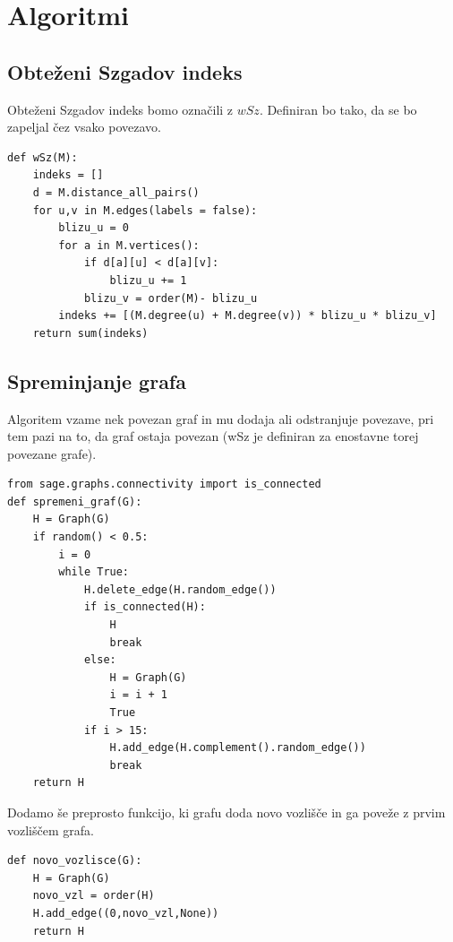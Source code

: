 \documentclass[12pt, a4paper]{article}
\begin{document}
\medskip


\newpage
\section[Algoritmi]{Algoritmi}

\subsection[Obteženi Szgadov indeks]{Obteženi Szgadov indeks}

Obteženi Szgadov indeks bomo označili z $wSz$. Definiran bo tako, da se bo zapeljal čez vsako povezavo.
 
\begin{verbatim}
def wSz(M):
    indeks = []
    d = M.distance_all_pairs()
    for u,v in M.edges(labels = false):
        blizu_u = 0
        for a in M.vertices():
            if d[a][u] < d[a][v]:
                blizu_u += 1
            blizu_v = order(M)- blizu_u
        indeks += [(M.degree(u) + M.degree(v)) * blizu_u * blizu_v]
    return sum(indeks)
\end{verbatim}

\subsection[Spreminjanje grafa]{Spreminjanje grafa}

Algoritem vzame nek povezan graf in mu dodaja ali odstranjuje povezave, pri tem pazi na to, da graf ostaja povezan (wSz je definiran za enostavne torej povezane grafe). 

\begin{verbatim}
from sage.graphs.connectivity import is_connected
def spremeni_graf(G):
    H = Graph(G)
    if random() < 0.5:
        i = 0
        while True:
            H.delete_edge(H.random_edge())
            if is_connected(H):
                H
                break
            else:
                H = Graph(G)
                i = i + 1
                True
            if i > 15: 
                H.add_edge(H.complement().random_edge()) 
                break
    return H
\end{verbatim}

Dodamo še preprosto funkcijo, ki grafu doda novo vozlišče in ga poveže z prvim vozliščem grafa.

\begin{verbatim}
def novo_vozlisce(G):
    H = Graph(G)
    novo_vzl = order(H)
    H.add_edge((0,novo_vzl,None))
    return H
\end{verbatim}
\end{document}
